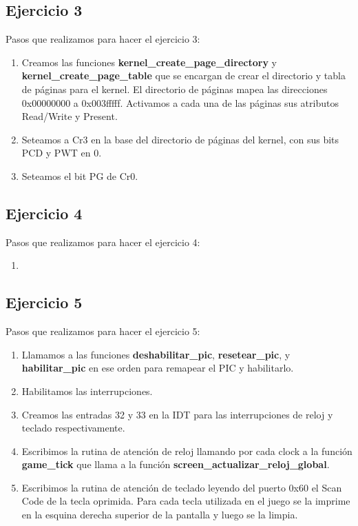 \documentclass[a4paper,10pt]{article}
\begin{document}
\subsection{Ejercicio 3}
Pasos que realizamos para hacer el ejercicio 3:
\begin{enumerate}
  \item Creamos las funciones \textbf{kernel\_create\_page\_directory} y \textbf{kernel\_create\_page\_table} que se encargan de crear el directorio y tabla de páginas para el kernel.
    El directorio de páginas mapea las direcciones 0x00000000 a 0x003fffff. Activamos a cada una de las páginas sus atributos Read/Write y Present.
  \item Seteamos a Cr3 en la base del directorio de páginas del kernel, con sus bits PCD y PWT en 0.
  \item Seteamos el bit PG de Cr0.
\end{enumerate} 

\subsection{Ejercicio 4}
Pasos que realizamos para hacer el ejercicio 4:
\begin{enumerate}
  \item
\end{enumerate}

\subsection{Ejercicio 5}
Pasos que realizamos para hacer el ejercicio 5:
\begin{enumerate}
  \item Llamamos a las funciones \textbf{deshabilitar\_pic}, \textbf{resetear\_pic}, y \textbf{habilitar\_pic} en ese orden para remapear el PIC y habilitarlo. 
  \item Habilitamos las interrupciones.
  \item Creamos las entradas 32 y 33 en la IDT para las interrupciones de reloj y teclado respectivamente. 
  \item Escribimos la rutina de atención de reloj llamando por cada clock a la función \textbf{game\_tick} que llama a la función \textbf{screen\_actualizar\_reloj\_global}.
  \item Escribimos la rutina de atención de teclado leyendo del puerto 0x60 el Scan Code de la tecla oprimida. Para cada tecla utilizada en el juego se la imprime en la esquina derecha superior de la pantalla y luego se la limpia.
\end{enumerate}
\end{document}
